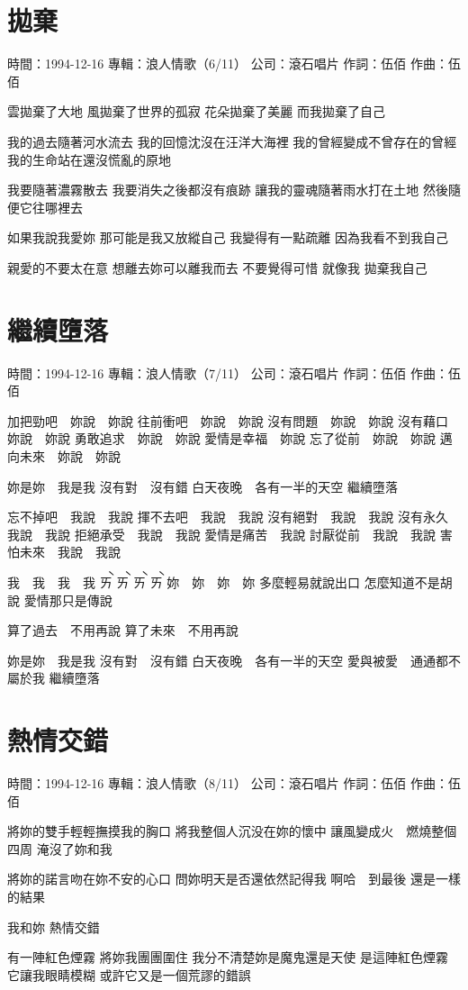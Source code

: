 \documentclass[UTF8,a4paper,oneside,twocolumn,12pt]{ctexbook}
\newcommand{\infopair}[2]{\textbullet #1：#2}
\newcommand{\zc}[1][伍佰]{\infopair{作詞}{#1}}
\newcommand{\zq}[1][伍佰]{\infopair{作曲}{#1}}
\newcommand{\zj}[1]{\infopair{專輯}{#1}}
\newcommand{\sj}[1]{\infopair{時間}{#1}}
\newcommand{\gs}[1]{\infopair{公司}{#1}}
\newenvironment{info}{\begin{flushleft}\kaishu
	}
	{\end{flushleft}\normalsize\yahei\par}
\newenvironment{lyric}{
	}
{}
\begin{document}
\section{拋棄}
\begin{info}
	\sj{1994-12-16}
	\zj{浪人情歌（6/11）}
	\gs{滾石唱片}
	\zc
	\zq
\end{info}
\begin{lyric}
	雲拋棄了大地
	風拋棄了世界的孤寂
	花朵拋棄了美麗
	而我拋棄了自己

	我的過去隨著河水流去
	我的回憶沈沒在汪洋大海裡
	我的曾經變成不曾存在的曾經
	我的生命站在還沒慌亂的原地

	我要隨著濃霧散去
	我要消失之後都沒有痕跡
	讓我的靈魂隨著雨水打在土地
	然後隨便它往哪裡去

	如果我說我愛妳
	那可能是我又放縱自己
	我變得有一點疏離
	因為我看不到我自己

	親愛的不要太在意
	想離去妳可以離我而去
	不要覺得可惜
	就像我 拋棄我自己
\end{lyric}

\section{繼續墮落}
\begin{info}
	\sj{1994-12-16}
	\zj{浪人情歌（7/11）}
	\gs{滾石唱片}
	\zc
	\zq
\end{info}
\begin{lyric}
	加把勁吧　妳說　妳說
	往前衝吧　妳說　妳說
	沒有問題　妳說　妳說
	沒有藉口　妳說　妳說
	勇敢追求　妳說　妳說
	愛情是幸福　妳說
	忘了從前　妳說　妳說
	邁向未來　妳說　妳說

	妳是妳　我是我
	沒有對　沒有錯
	白天夜晚　各有一半的天空
	繼續墮落

	忘不掉吧　我說　我說
	揮不去吧　我說　我說
	沒有絕對　我說　我說
	沒有永久　我說　我說
	拒絕承受　我說　我說
	愛情是痛苦　我說
	討厭從前　我說　我說
	害怕未來　我說　我說

	我　我　我　我
	\`ㄞ \`ㄞ \`ㄞ \`ㄞ
	妳　妳　妳　妳
	多麼輕易就說出口
	怎麼知道不是胡說
	愛情那只是傳說

	算了過去　不用再說
	算了未來　不用再說

	妳是妳　我是我
	沒有對　沒有錯
	白天夜晚　各有一半的天空
	愛與被愛　通通都不屬於我
	繼續墮落
\end{lyric}

\section{熱情交錯}
\begin{info}
	\sj{1994-12-16}
	\zj{浪人情歌（8/11）}
	\gs{滾石唱片}
	\zc
	\zq
\end{info}
\begin{lyric}
	將妳的雙手輕輕撫摸我的胸口
	將我整個人沉没在妳的懷中
	讓風變成火　燃燒整個四周
	淹沒了妳和我

	將妳的諾言吻在妳不安的心口
	問妳明天是否還依然記得我
	啊哈　到最後
	還是一樣的結果

	我和妳
	熱情交錯

	有一陣紅色煙霧
	將妳我團團圍住
	我分不清楚妳是魔鬼還是天使
	是這陣紅色煙霧
	它讓我眼睛模糊
	或許它又是一個荒謬的錯誤
\end{lyric}
\end{document}
